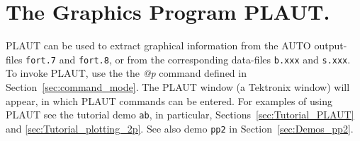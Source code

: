 \documentclass[12pt]{report}
\begin{document}
\chapter{ The Graphics Program PLAUT.} \label{ch:PLAUT}
{\cal PLAUT} can be used to extract graphical
information from the {\cal AUTO} output-files {\tt fort.7} and {\tt fort.8},
or from the corresponding data-files {\tt b.xxx} and {\tt s.xxx}.
To invoke {\cal PLAUT}, use the the {\it @p} command defined in 
Section~\ref{sec:command_mode}.
The {\cal PLAUT} window (a Tektronix window) will appear, in which {\cal PLAUT}
commands can be entered.
For examples of using {\cal PLAUT} see the tutorial demo {\tt ab}, in particular,
Sections~\ref{sec:Tutorial_PLAUT} and \ref{sec:Tutorial_plotting_2p}.
See also demo {\tt pp2} in Section~\ref{sec:Demos_pp2}.
\end{document}
